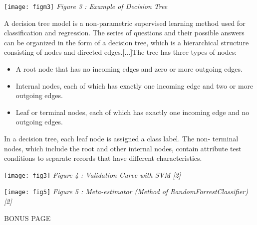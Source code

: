 \documentclass[10pt]{report}
\begin{document}
\begin{minipage}[c]{.46\linewidth} 
\begin{center}
\texttt{[image: figm3]}
\flushleft \emph{Figure 3 : Example of Decision Tree} \\[0.5cm]
\end{center}
\end{minipage}
\begin{minipage}[c]{.46\linewidth} 
\begin{flushleft}
\small
A decision tree model is a non-parametric supervised learning method used for classification and regression. The series of questions and their possible answers can be organized in the form of a decision tree, which is a hierarchical structure consisting of nodes and directed edges.[...]The tree has three types of nodes:
\begin{itemize}
\item A root node that has no incoming edges and zero or more outgoing edges.
\item Internal nodes, each of which has exactly one incoming edge and two or more outgoing edges.
\item Leaf or terminal nodes, each of which has exactly one incoming edge and no outgoing edges.
\end{itemize}
In a decision tree, each leaf node is assigned a class label. The non- terminal nodes, which include the root and other internal nodes, contain attribute test conditions to separate records that have different characteristics.
\end{flushleft}
\end{minipage}

\bigbreak
\bigbreak

\begin{minipage}[c]{.46\linewidth} 
\begin{center}
\texttt{[image: fig3]}
\emph{Figure 4 : Validation Curve with SVM [2]}
\end{center}
\end{minipage}
\begin{minipage}[c]{.46\linewidth}  
\begin{center}
\texttt{[image: fig5]}
\emph{Figure 5 : Meta-estimator (Method of RandomForrestClassifier) [2]}
\end{center}
\end{minipage}

\clearpage

\begin{center}
\Large BONUS PAGE
\end{center}
\end{document}
